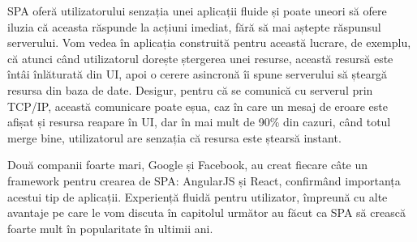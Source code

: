 SPA oferă utilizatorului senzația unei
aplicații fluide și poate uneori să ofere iluzia că aceasta răspunde la acțiuni
imediat, fără să mai aștepte răspunsul serverului. Vom vedea în aplicația
construită pentru această lucrare, de exemplu, că atunci când utilizatorul
dorește ștergerea unei resurse, această resursă este întâi înlăturată din UI,
apoi o cerere asincronă îi spune serverului să șteargă resursa din baza de date.
Desigur, pentru că se comunică cu serverul prin TCP/IP, această comunicare
poate eșua, caz în care un mesaj de eroare este afișat și resursa reapare în UI,
dar în mai mult de 90\% din cazuri, când totul merge bine, utilizatorul are
senzația că resursa este ștearsă instant.

Două companii foarte mari, Google și Facebook,
au creat fiecare  câte un framework pentru crearea de SPA: AngularJS și React,
confirmând importanța acestui tip de aplicații. Experiență fluidă pentru utilizator, împreună cu alte avantaje pe care le
vom discuta în capitolul următor au făcut ca SPA să crească foarte mult în popularitate
în ultimii ani.



